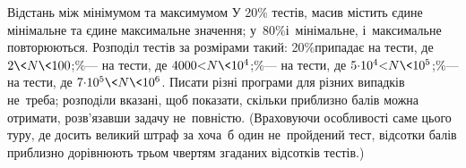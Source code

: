 \begin{problemAllDefault}{Відстань між мінімумом та максимумом}
\Scoring
У 20\% тестів, масив містить єдине мінімальне та єдине максимальне значення; у~80\%\nolinebreak[2] і~мінімальне, і~максимальне повторюються.
% 
Розподіл тестів за розмірами такий:
20\%\nolinebreak[3] припадає на тести, де $2{\<}N{\<}100$;\hspace{1mm plus 1mm}\%\nolinebreak[3]\nolinebreak[3] --- на тести, де $4000{<}N{\<}10^4$;\hspace{1mm plus 1mm}\%\nolinebreak[3]\nolinebreak[3] --- на тести, де $5{\cdot}10^4{<}N{\<}10^5$;\hspace{1mm plus 1mm}\%\nolinebreak[3]\nolinebreak[3] --- на тести, де $7{\cdot}10^5{\<}N{\<}10^6$.
% 
Писати різні програми для різних випадків не~треба;
розподіли вказані, щоб показати,
скільки приблизно балів можна отримати, розв'язавши задачу не~повністю.
(Враховуючи особливості саме цього туру, де досить великий штраф за хоча~б один не~пройдений тест, відсотки балів приблизно дорівнюють трьом чвертям 
згаданих відсотків тестів.)






\end{problemAllDefault}